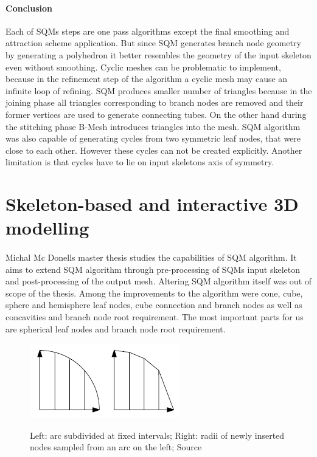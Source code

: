 \paragraph{Conclusion}
Each of SQMs steps are one pass algorithms except the final smoothing and attraction scheme application. But since SQM generates branch node geometry by generating a polyhedron it better resembles the geometry of the input skeleton even without smoothing. Cyclic meshes can be problematic to implement, because in the refinement step of the algorithm a cyclic mesh may cause an infinite loop of refining. SQM produces smaller number of triangles because in the joining phase all triangles corresponding to branch nodes are removed and their former vertices are used to generate connecting tubes. On the other hand during the stitching phase B-Mesh introduces triangles into the mesh. SQM algorithm was also capable of generating cycles from two symmetric leaf nodes, that were close to each other. However these cycles can not be created explicitly. Another limitation is that cycles have to lie on input skeletons axis of symmetry.

\section{Skeleton-based and interactive 3D modelling} 
\paragraph{}
Michal Mc Donells master thesis studies the capabilities of SQM algorithm. It aims to extend SQM algorithm through pre-processing of SQMs input skeleton and post-processing of the output mesh. Altering SQM algorithm itself was out of scope of the thesis. Among the improvements to the algorithm were cone, cube, sphere and hemisphere leaf nodes, cube connection and branch nodes as well as concavities and branch node root requirement. The most important parts for us are spherical leaf nodes and branch node root requirement.

\begin{figure}[h]
    \centering
    \includegraphics[]{images/spherical_node.png}
    \label{fig:esqm_spherical}
    \caption[Spherical nodes radii]{Left: arc subdivided at fixed intervals; Right: radii of newly inserted nodes sampled from an arc on the left; Source \cite{sqm_phd}}
\end{figure}

